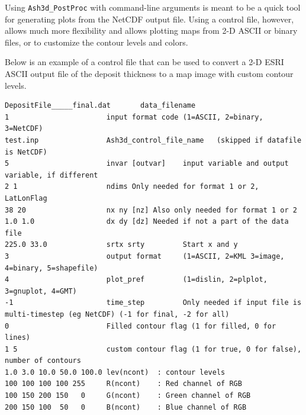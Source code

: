 Using \texttt{Ash3d\_PostProc} with command-line arguments is meant to be a
quick tool for generating plots from the NetCDF output file. Using a control
file, however, allows much more flexibility and allows plotting maps
from 2-D ASCII or binary files, or to customize the contour levels and colors.

Below is an example of a control file that can be used to convert a 2-D ESRI ASCII
output file of the deposit thickness to a map image with custom contour levels.

\small
\begin{verbatim}
DepositFile_____final.dat       data_filename
1                       input format code (1=ASCII, 2=binary, 3=NetCDF)
test.inp                Ash3d_control_file_name   (skipped if datafile is NetCDF)
5                       invar [outvar]    input variable and output variable, if different
2 1                     ndims Only needed for format 1 or 2, LatLonFlag
38 20                   nx ny [nz] Also only needed for format 1 or 2
1.0 1.0                 dx dy [dz] Needed if not a part of the data file
225.0 33.0              srtx srty         Start x and y
3                       output format     (1=ASCII, 2=KML 3=image, 4=binary, 5=shapefile)
4                       plot_pref         (1=dislin, 2=plplot, 3=gnuplot, 4=GMT)
-1                      time_step         Only needed if input file is multi-timestep (eg NetCDF) (-1 for final, -2 for all)
0                       Filled contour flag (1 for filled, 0 for lines)
1 5                     custom contour flag (1 for true, 0 for false), number of contours
1.0 3.0 10.0 50.0 100.0 lev(ncont)  : contour levels
100 100 100 100 255     R(ncont)    : Red channel of RGB
100 150 200 150   0     G(ncont)    : Green channel of RGB
200 150 100  50   0     B(ncont)    : Blue channel of RGB
\end{verbatim}
\normalsize

